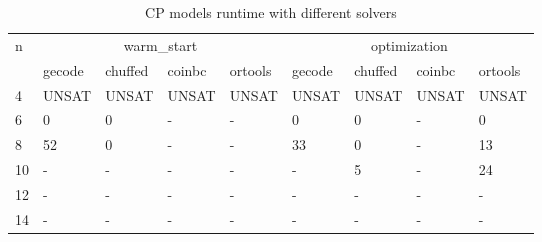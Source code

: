 \documentclass{article}
\begin{document}
\begin{table}[H]
\centering
{\small
\begin{tabular}{ |p{0.35cm}|p{1.21cm}|p{1.21cm}|p{1.21cm}|p{1.21cm}||p{1.21cm}|p{1.21cm}|p{1.21cm}|p{1.21cm}|}
 \hline
 \multirow{2}{*}{n} & \multicolumn{4}{|c|}{warm\_start}& \multicolumn{4}{|c|}{optimization}\\
 \cline{2-9}
  &  gecode& chuffed & coinbc & ortools & gecode& chuffed & coinbc & ortools \\
 \hline
 4&  UNSAT& UNSAT& UNSAT&   UNSAT&  UNSAT& UNSAT& UNSAT&    UNSAT\\
 6&   0& 0&  -&  -&  0& 0& -&        0\\
 8&   52&  0& -&   -&  33& 0& -&   13\\
 10&  -& -&  -&   -&  -& 5& -&   24\\
 12&  -&  -&  -& -&  -& -& -&   - \\
 14&  -&  -& -&  -&  -& -& -&    -\\

\end{tabular}}

\caption{CP models runtime with different solvers }
\label{table:1}
\end{table}

 
\end{document}
